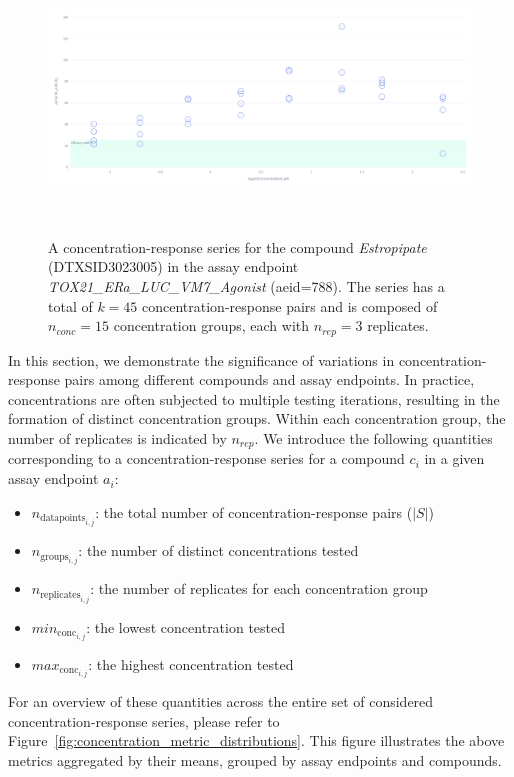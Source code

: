 \begin{figure}[htbp]  %
    \centering
    \includegraphics[width=1.0\textwidth]{figures/concentration_response_series.png}  
    \caption{A concentration-response series for the compound \textit{Estropipate} (DTXSID3023005) in the assay endpoint \textit{TOX21\_ERa\_LUC\_VM7\_Agonist} (aeid=788). The series has a total of $k = 45$ concentration-response pairs and is composed of $n_{conc} = 15$ concentration groups, each with $n_{rep} = 3$ replicates.}
~\label{fig:concentration_response_series} 
\end{figure}

In this section, we demonstrate the significance of variations in concentration-response pairs among different compounds and assay endpoints. In practice, concentrations are often subjected to multiple testing iterations, resulting in the formation of distinct concentration groups. Within each concentration group, the number of replicates is indicated by $n_{rep}$.
We introduce the following quantities corresponding to a concentration-response series for a compound $c_i$ in a given assay endpoint $a_i$:
\begin{itemize}
    \item $n_{\text{datapoints}_{i,j}}$: the total number of concentration-response pairs ($|S|$)
    \item $n_{\text{groups}_{i,j}}$: the number of distinct concentrations tested
    \item $n_{\text{replicates}_{i,j}}$: the number of replicates for each concentration group
    \item $min_{\text{conc}_{i,j}}$: the lowest concentration tested
    \item $max_{\text{conc}_{i,j}}$: the highest concentration tested
\end{itemize}


For an overview of these quantities across the entire set of considered concentration-response series, please refer to Figure~\ref{fig:concentration_metric_distributions}. This figure illustrates the above metrics aggregated by their means, grouped by assay endpoints and compounds.



